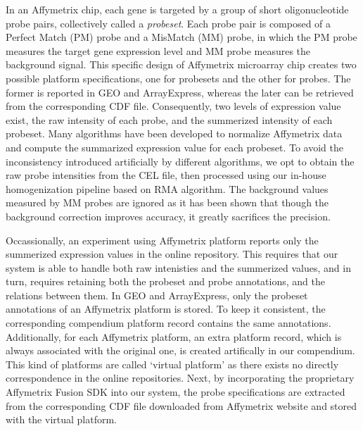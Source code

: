 In an Affymetrix chip, each gene is targeted by a group of short
oligonucleotide probe pairs, collectively called a \textit{probeset}.
%
Each probe pair is composed of a Perfect Match (PM) probe and a MisMatch
(MM) probe, in which the PM probe measures the target gene expression
level and MM probe measures the background signal.
%
This specific design of Affymetrix microarray chip creates two possible
platform specifications, one for probesets and the other for probes.
%
The former is reported in GEO and ArrayExpress, whereas the later can be
retrieved from the corresponding CDF file.
%
Consequently, two levels of expression value exist, the raw intensity of
each probe, and the summerized intensity of each probeset.
%
Many algorithms \cite{Irizarry2003, Li2001, Hubbell2002} have been developed to
normalize Affymetrix data and compute the summarized expression value for each
probeset.
%
To avoid the inconsistency introduced artificially by different algorithms, we
opt to obtain the raw probe intensities from the CEL file, then processed using
our in-house homogenization pipeline based on RMA algorithm.
%
%
%
The background values measured by MM probes are ignored as it has been shown
that though the background correction improves accuracy, it greatly sacrifices
the precision\cite{Irizarry2006}.


Occassionally, an experiment using Affymetrix platform reports only the
summerized expression values in the online repository.
%
This requires that our system is able to handle both raw intenisties and the
summerized values, and in turn, requires retaining both the probeset and probe
annotations, and the relations between them.
%
In GEO and ArrayExpress, only the probeset annotations of an Affymetrix
platform is stored.
%
To keep it consistent, the corresponding compendium platform record contains
the same annotations.
%
Additionally, for each Affymetrix platform, an extra platform record, which is
always associated with the original one, is created artifically in our
compendium.
%
This kind of platforms are called `virtual platform' as there exists no
directly correspondence in the online repositories.
%
Next, by incorporating the proprietary Affymetrix Fusion SDK into our system,
the probe specifications are extracted from the corresponding CDF file
downloaded from Affymetrix website and stored with the virtual platform.
%
% 


